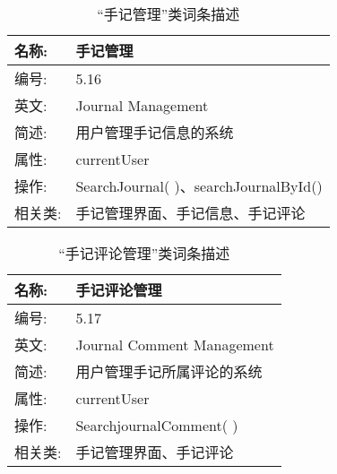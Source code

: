 \begin{table}[H]  
\caption{“手记管理”类词条描述}  
\begin{center}  
    \begin{tabular}{l p{11cm}} 
        \hline
        \quad 名称:  & 手记管理 \\
        \hline
        \quad 编号:  & 5.16 \\
        \hline
        \quad 英文:  &  Journal Management\\
        \hline
        \quad 简述:  & 用户管理手记信息的系统 \\
        \hline
        \quad 属性:  & currentUser \\
        \hline
        \quad 操作:  & SearchJournal( )、searchJournalById()\\
        \hline
        \quad 相关类: & 手记管理界面、手记信息、手记评论\\
        \hline
    \end{tabular}
\end{center}
\end{table}

\begin{table}[H]  
\caption{“手记评论管理”类词条描述}  
\begin{center}  
    \begin{tabular}{l p{11cm}} 
        \hline
        \quad 名称:  & 手记评论管理 \\
        \hline
        \quad 编号:  & 5.17 \\
        \hline
        \quad 英文:  &  Journal Comment Management\\
        \hline
        \quad 简述:  & 用户管理手记所属评论的系统 \\
        \hline
        \quad 属性:  & currentUser \\
        \hline
        \quad 操作:  & SearchjournalComment( ) \\
        \hline
        \quad 相关类: & 手记管理界面、手记评论\\
        \hline
    \end{tabular}
\end{center}
\end{table}

